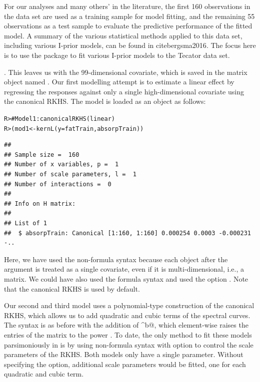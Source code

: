 \documentclass[a4paper,showframe,11pt]{report}\usepackage[]{graphicx}\usepackage[]{color}
\makeatletter
\newcommand{\hlcom}[1]{\textcolor[rgb]{0.588,0.588,0.588}{#1}}%
\newcommand{\hlstd}[1]{\textcolor[rgb]{0.196,0.196,0.196}{#1}}%
\newcommand{\hlkwb}[1]{\textcolor[rgb]{0.627,0,0.314}{#1}}%
\newcommand{\hlkwc}[1]{\textcolor[rgb]{0,0.631,0.314}{#1}}%
\newcommand{\hlkwd}[1]{\textcolor[rgb]{0.78,0.227,0.412}{#1}}%
\newenvironment{kframe}{%
 \def\at@end@of@kframe{}%
 \ifinner\ifhmode%
  \def\at@end@of@kframe{\end{minipage}}%
  \begin{minipage}{\columnwidth}%
 \fi\fi%
 \def\FrameCommand##1{\hskip\@totalleftmargin \hskip-\fboxsep
 \colorbox{shadecolor}{##1}\hskip-\fboxsep
     \hskip-\linewidth \hskip-\@totalleftmargin \hskip\columnwidth}%
 \MakeFramed {\advance\hsize-\width
   \@totalleftmargin\z@ \linewidth\hsize
   \@setminipage}}%
 {\par\unskip\endMakeFramed%
 \at@end@of@kframe}
\newenvironment{knitrout}{}{} %
\makeatother
\begin{document}
For our analyses and many others' in the literature, the first 160 observations in the data set are used as a training sample for model fitting, and the remaining 55 observations as a test sample to evaluate the predictive performance of the fitted model. A summary of the various statistical methods applied to this data set, including various I-prior models, can be found in cite{bergsma2016}. The focus here is to use the  package to fit various I-prior models to the Tecator data set.

. This leaves us with the 99-dimensional covariate, which is saved in the matrix object named . Our first modelling attempt is to estimate a linear effect by regressing the responses  against only a single high-dimensional covariate  using the canonical RKHS. The model is loaded as an  object as follows:

\begin{knitrout}
\color{fgcolor}\begin{kframe}
\begin{alltt}
\hlstd{R> }\hlcom{# Model 1: canonical RKHS (linear)}
\hlstd{R> }\hlstd{(mod1} \hlkwb{<-} \hlkwd{kernL}\hlstd{(}\hlkwc{y} \hlstd{= fatTrain, absorpTrain))}
\end{alltt}
\begin{verbatim}
## 
## Sample size =  160 
## Number of x variables, p =  1 
## Number of scale parameters, l =  1 
## Number of interactions =  0 
## 
## Info on H matrix:
## 
## List of 1
##  $ absorpTrain: Canonical [1:160, 1:160] 0.000254 0.0003 -0.000231 -..
\end{verbatim}
\end{kframe}
\end{knitrout}

Here, we have used the non-formula syntax because each object after the  argument is treated as a single covariate, even if it is multi-dimensional, i.e., a matrix. We could have also used the formula syntax and used the  option . Note that the canonical RKHS is used by default.

Our second and third model uses a polynomial-type construction of the canonical RKHS, which allows us to add quadratic and cubic terms of the spectral curves. The syntax is as before with the addition of \verb@absorpTrain^b@, which element-wise raises the entries of the matrix   to the power . To date, the only method to fit these models parsimoniously in  is by using non-formula syntax with  option  to control the scale parameters of the RKHS. Both models only have a single parameter. Without specifying the  option, additional scale parameters would be fitted, one for each quadratic and cubic term.
\end{document}
